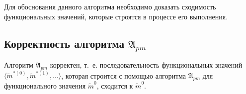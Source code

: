 Для обоснования данного алгоритма необходимо доказать сходимость функциональных значений, которые строятся в процессе его выполнения.


\subsection{Корректность алгоритма $\mathfrak A_{pm}$} \label{sect3_4}

\begin{Theorem}
	Алгоритм $\mathfrak A_{pm}$ корректен, т.~е. последовательность функциональных значений $\langle\tilde m^{*(0)},\tilde m^{*(1)},\dots\rangle$, которая строится с помощью алгоритма $\mathfrak A_{pm}$ для функционального значения $\tilde m^0$, сходится к $\tilde m^0$.
\end{Theorem}

